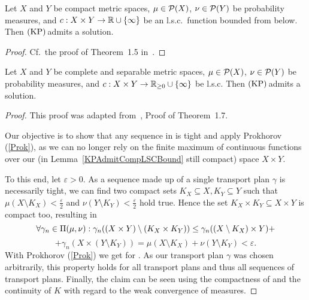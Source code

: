 \begin{lemma}\label{KPAdmitCompLSCBound}
	Let $X$ and $Y$ be compact metric spaces, $\mu \in \PM{X}$, $\nu \in \PM{Y}$ be probability measures, and $\map[c]{X \times Y}{\R \cup \{ \infty \}}$ be an l.s.c.\ function bounded from below. Then$\text{\normalfont\ (KP)\,}$admits a solution.
\end{lemma}

\begin{proof}
	Cf.~the proof of Theorem~1.5 in~\cite{San2015}.
\end{proof}

\begin{theorem}\label{KPAdmitPolishLSC}
	Let $X$ and $Y$ be complete and separable metric spaces, $\mu \in \PM{X}$, $\nu \in \PM{Y}$ be probability measures, and $\map[c]{X \times Y}{\RZero \cup \{ \infty \}}$ be l.s.c. Then$\text{\normalfont\ (KP)\,}$admits a solution.
\end{theorem}

\begin{proof}
	This proof was adapted from~\cite{San2015}, Proof of Theorem~1.7.

	Our objective is to show that any sequence in \TP{\mu}{\nu} is tight and apply Prokhorov (\ref{Prok}), as we can no longer rely on the finite maximum of continuous functions over our (in Lemma~\ref{KPAdmitCompLSCBound} still compact) space $X \times Y$.

	To this end, let $\varepsilon > 0$. As a sequence made up of a single transport plan $\gamma$ is necessarily tight, we can find two compact sets $K_X \subseteq X, K_Y \subseteq Y$ such that $\mu(X \setminus K_X) < \frac{\varepsilon}{2}$ and $\nu(Y \setminus K_Y) < \frac{\varepsilon}{2}$ hold true. Hence the set $K_X \times K_Y \subseteq X \times Y$ is compact too, resulting in
	\[ \forall \gamma_n \in \TP{\mu}{\nu}: \gamma_n((X \times Y) \setminus (K_X \times K_Y)) \le \gamma_n ((X \setminus K_X) \times Y) + \]
	\[ + \gamma_n(X \times (Y \setminus K_Y)) = \mu(X \setminus K_X) + \nu(Y \setminus K_Y) < \varepsilon. \]
	With Prokhorov (\ref{Prok}) we get  for \Ninf. As our transport plan $\gamma$ was chosen arbitrarily, this property holds for all transport plans and thus all sequences of transport plans. Finally, the claim can be seen using the compactness of \TP{\mu}{\nu} and the continuity of $K$ with regard to the weak convergence of measures.
\end{proof}

